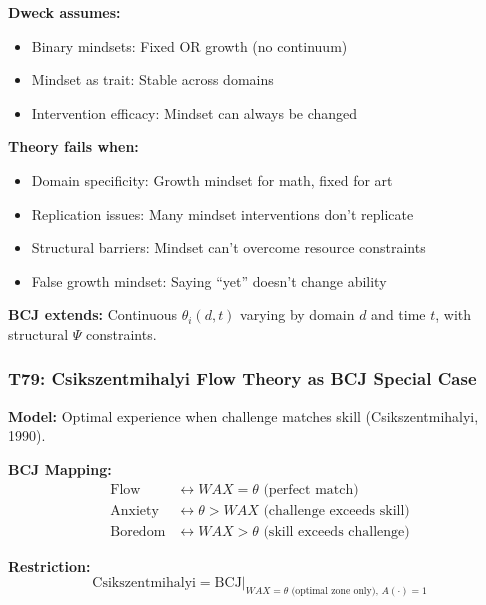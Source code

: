 \begin{tcolorbox}[colback=red!5!white, colframe=red!75!black,
    title=Boundary Condition: Where Dweck Fails]
\textbf{Dweck assumes:}
\begin{itemize}[nosep]
\item Binary mindsets: Fixed OR growth (no continuum)
\item Mindset as trait: Stable across domains
\item Intervention efficacy: Mindset can always be changed
\end{itemize}

\textbf{Theory fails when:}
\begin{itemize}[nosep]
\item Domain specificity: Growth mindset for math, fixed for art
\item Replication issues: Many mindset interventions don't replicate
\item Structural barriers: Mindset can't overcome resource constraints
\item False growth mindset: Saying ``yet'' doesn't change ability
\end{itemize}

\textbf{BCJ extends:} Continuous $\theta_i(d, t)$ varying by domain $d$ and time $t$, with structural $\Psi$ constraints.
\end{tcolorbox}

\subsubsection*{T79: Csikszentmihalyi Flow Theory as BCJ Special Case}

\textbf{Model:} Optimal experience when challenge matches skill (Csikszentmihalyi, 1990).

\textbf{BCJ Mapping:}
\begin{align}
\text{Flow} &\leftrightarrow WAX = \theta \text{ (perfect match)} \\
\text{Anxiety} &\leftrightarrow \theta > WAX \text{ (challenge exceeds skill)} \\
\text{Boredom} &\leftrightarrow WAX > \theta \text{ (skill exceeds challenge)}
\end{align}

\textbf{Restriction:}
\begin{equation}
\text{Csikszentmihalyi} = \text{BCJ} \big|_{WAX = \theta \text{ (optimal zone only)}, \, A(\cdot) = 1}
\end{equation}

